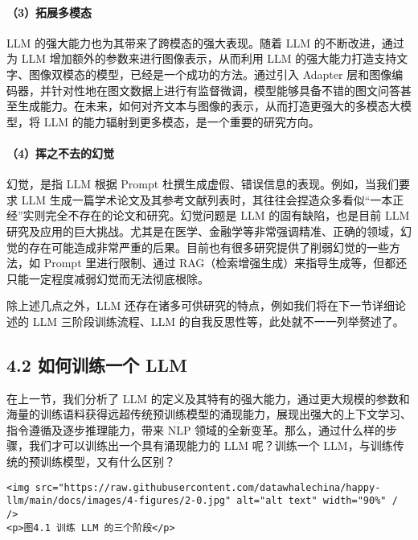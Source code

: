 \documentclass[
]{article}
\begin{document}
\paragraph{（3）拓展多模态}\label{ux62d3ux5c55ux591aux6a21ux6001}

LLM 的强大能力也为其带来了跨模态的强大表现。随着 LLM 的不断改进，通过为
LLM 增加额外的参数来进行图像表示，从而利用 LLM
的强大能力打造支持文字、图像双模态的模型，已经是一个成功的方法。通过引入
Adapter
层和图像编码器，并针对性地在图文数据上进行有监督微调，模型能够具备不错的图文问答甚至生成能力。在未来，如何对齐文本与图像的表示，从而打造更强大的多模态大模型，将
LLM 的能力辐射到更多模态，是一个重要的研究方向。

\paragraph{（4）挥之不去的幻觉}\label{ux6325ux4e4bux4e0dux53bbux7684ux5e7bux89c9}

幻觉，是指 LLM 根据 Prompt
杜撰生成虚假、错误信息的表现。例如，当我们要求 LLM
生成一篇学术论文及其参考文献列表时，其往往会捏造众多看似``一本正经''实则完全不存在的论文和研究。幻觉问题是
LLM 的固有缺陷，也是目前 LLM
研究及应用的巨大挑战。尤其是在医学、金融学等非常强调精准、正确的领域，幻觉的存在可能造成非常严重的后果。目前也有很多研究提供了削弱幻觉的一些方法，如
Prompt 里进行限制、通过
RAG（检索增强生成）来指导生成等，但都还只能一定程度减弱幻觉而无法彻底根除。

除上述几点之外，LLM
还存在诸多可供研究的特点，例如我们将在下一节详细论述的 LLM
三阶段训练流程、LLM 的自我反思性等，此处就不一一列举赘述了。

\subsection{4.2 如何训练一个
LLM}\label{ux5982ux4f55ux8badux7ec3ux4e00ux4e2a-llm}

在上一节，我们分析了 LLM
的定义及其特有的强大能力，通过更大规模的参数和海量的训练语料获得远超传统预训练模型的涌现能力，展现出强大的上下文学习、指令遵循及逐步推理能力，带来
NLP
领域的全新变革。那么，通过什么样的步骤，我们才可以训练出一个具有涌现能力的
LLM 呢？训练一个 LLM，与训练传统的预训练模型，又有什么区别？

\begin{verbatim}
<img src="https://raw.githubusercontent.com/datawhalechina/happy-llm/main/docs/images/4-figures/2-0.jpg" alt="alt text" width="90%" / />
<p>图4.1 训练 LLM 的三个阶段</p>
\end{verbatim}
\end{document}
